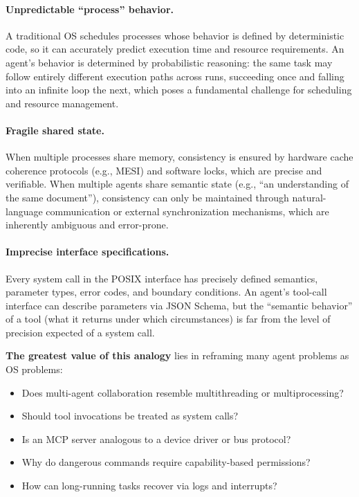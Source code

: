 \paragraph{Unpredictable ``process'' behavior.}
A traditional OS schedules processes whose behavior is defined by deterministic code, so it can accurately predict execution time and resource requirements.
An agent's behavior is determined by probabilistic reasoning: the same task may follow entirely different execution paths across runs, succeeding once and falling into an infinite loop the next, which poses a fundamental challenge for scheduling and resource management.

\paragraph{Fragile shared state.}
When multiple processes share memory, consistency is ensured by hardware cache coherence protocols (e.g., MESI) and software locks, which are precise and verifiable.
When multiple agents share semantic state (e.g., ``an understanding of the same document''), consistency can only be maintained through natural-language communication or external synchronization mechanisms, which are inherently ambiguous and error-prone.

\paragraph{Imprecise interface specifications.}
Every system call in the POSIX interface has precisely defined semantics, parameter types, error codes, and boundary conditions.
An agent's tool-call interface can describe parameters via JSON Schema, but the ``semantic behavior'' of a tool (what it returns under which circumstances) is far from the level of precision expected of a system call.

\textbf{The greatest value of this analogy} lies in reframing many agent problems as OS problems:
\begin{itemize}[nosep]
\item Does multi-agent collaboration resemble multithreading or multiprocessing?~\cite{wu2023autogen}
\item Should tool invocations be treated as system calls?
\item Is an MCP server analogous to a device driver or bus protocol?~\cite{mcp_intro_2026}
\item Why do dangerous commands require capability-based permissions?~\cite{debenedetti2025camel}
\item How can long-running tasks recover via logs and interrupts?~\cite{openai_codex_approvals_2026}
\end{itemize}

